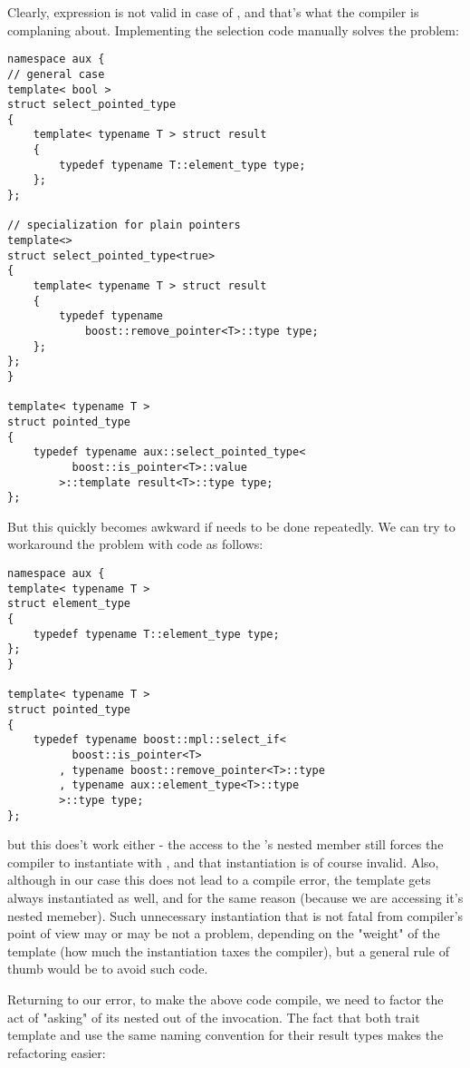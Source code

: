 \documentclass{netobjectdays}
\begin{document}
Clearly,  expression is not 
valid in case of , and that's what the 
compiler is complaning about. Implementing the selection code 
manually solves the problem: 

{\footnotesize
\begin{verbatim}
namespace aux {
// general case
template< bool >
struct select_pointed_type
{
    template< typename T > struct result
    {
        typedef typename T::element_type type;
    };
};

// specialization for plain pointers
template<>
struct select_pointed_type<true>
{
    template< typename T > struct result
    {
        typedef typename
            boost::remove_pointer<T>::type type;
    };
};
}

template< typename T >
struct pointed_type
{
    typedef typename aux::select_pointed_type<
          boost::is_pointer<T>::value
        >::template result<T>::type type;
};
\end{verbatim}
}

But this quickly becomes awkward if needs to be done 
repeatedly. We can try to workaround the problem with 
 code as follows:

{\footnotesize
\begin{verbatim}
namespace aux {
template< typename T >
struct element_type
{
	typedef typename T::element_type type;
};
}

template< typename T >
struct pointed_type
{
    typedef typename boost::mpl::select_if<
          boost::is_pointer<T>
        , typename boost::remove_pointer<T>::type
        , typename aux::element_type<T>::type
        >::type type;
};
\end{verbatim}
}

but this does't work either - the access to the 
's nested  member still 
forces the compiler to instantiate 
with , and that instantiation is of course 
invalid. Also, although in our case this does not lead to a 
compile error, the  template 
gets always instantiated as well, and for the same reason 
(because we are accessing it's nested  memeber). 
Such unnecessary instantiation that is not fatal from 
compiler's point of view may or may be not a problem, 
depending on the "weight" of the template (how much the 
instantiation taxes the compiler), but a general rule of 
thumb would be to avoid such code.

Returning to our error, to make the above code compile, we 
need to factor the act of "asking" 
of its nested  out of the  
invocation. The fact that both 
trait template and  use the same 
naming convention for their result types makes the refactoring 
easier:
\end{document}
